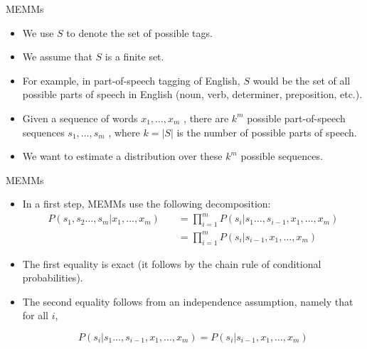 \documentclass[handout]{beamer}
\begin{document}
\begin{frame}{MEMMs}
\begin{scriptsize}
\begin{itemize}
\item We use $S$ to denote the set of possible tags.
\item We assume that $S$ is a finite set. 
 \item For example, in part-of-speech tagging of English, $S$ would be the set of all possible parts of speech in English (noun, verb, determiner, preposition, etc.).
 \item Given a sequence of words $x_1, \dots, x_m$ , there are $k^m$ possible part-of-speech sequences $s_1, \dots, s_m$ , where $k = |S|$ is the number of possible parts of speech.
 \item We want to estimate a distribution over these $k^m$ possible sequences.
\end{itemize}


\end{scriptsize}
\end{frame}


\begin{frame}{MEMMs}
\begin{scriptsize}
\begin{itemize}
 \item In a first step, MEMMs use the following decomposition:
 \begin{equation}
\begin{split}
  P(s_1,s_2 \dots, s_m | x_1, \dots, x_m) \quad & =  \prod_{i=1}^{m}    P(s_i | s_1 \dots, s_{i-1}, x_1, \dots, x_m)\\
 \quad & =  \prod_{i=1}^{m}    P(s_i | s_{i-1}, x_1, \dots, x_m)
\end{split}
\end{equation}

\item The first equality is exact (it follows by the chain rule of conditional probabilities).

\item The second equality follows from an independence assumption, namely that for all $i$,

\begin{displaymath}
 P(s_i | s_1 \dots, s_{i-1}, x_1, \dots, x_m) =   P(s_i | s_{i-1}, x_1, \dots, x_m)
\end{displaymath}


 
\end{itemize}


\end{scriptsize}
\end{frame}
\end{document}
